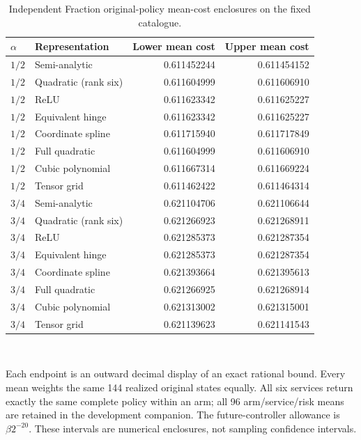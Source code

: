 \begin{table}[t]\centering\small
\caption{Independent Fraction original-policy mean-cost enclosures on the fixed catalogue.}\label{tab:independent119d}
\begin{tabular}{llrr}\hline
$\alpha$ & Representation & Lower mean cost & Upper mean cost \\ \hline
$1/2$ & Semi-analytic & 0.611452244 & 0.611454152 \\
$1/2$ & Quadratic (rank six) & 0.611604999 & 0.611606910 \\
$1/2$ & ReLU & 0.611623342 & 0.611625227 \\
$1/2$ & Equivalent hinge & 0.611623342 & 0.611625227 \\
$1/2$ & Coordinate spline & 0.611715940 & 0.611717849 \\
$1/2$ & Full quadratic & 0.611604999 & 0.611606910 \\
$1/2$ & Cubic polynomial & 0.611667314 & 0.611669224 \\
$1/2$ & Tensor grid & 0.611462422 & 0.611464314 \\
$3/4$ & Semi-analytic & 0.621104706 & 0.621106644 \\
$3/4$ & Quadratic (rank six) & 0.621266923 & 0.621268911 \\
$3/4$ & ReLU & 0.621285373 & 0.621287354 \\
$3/4$ & Equivalent hinge & 0.621285373 & 0.621287354 \\
$3/4$ & Coordinate spline & 0.621393664 & 0.621395613 \\
$3/4$ & Full quadratic & 0.621266925 & 0.621268914 \\
$3/4$ & Cubic polynomial & 0.621313002 & 0.621315001 \\
$3/4$ & Tensor grid & 0.621139623 & 0.621141543 \\
\hline\end{tabular}
\\[4pt]\parbox{.96\linewidth}{\footnotesize Each endpoint is an outward decimal display of an exact rational bound. Every mean weights the same 144 realized original states equally. All six services return exactly the same complete policy within an arm; all 96 arm/service/risk means are retained in the development companion. The future-controller allowance is $\beta 2^{-20}$. These intervals are numerical enclosures, not sampling confidence intervals.}
\end{table}
